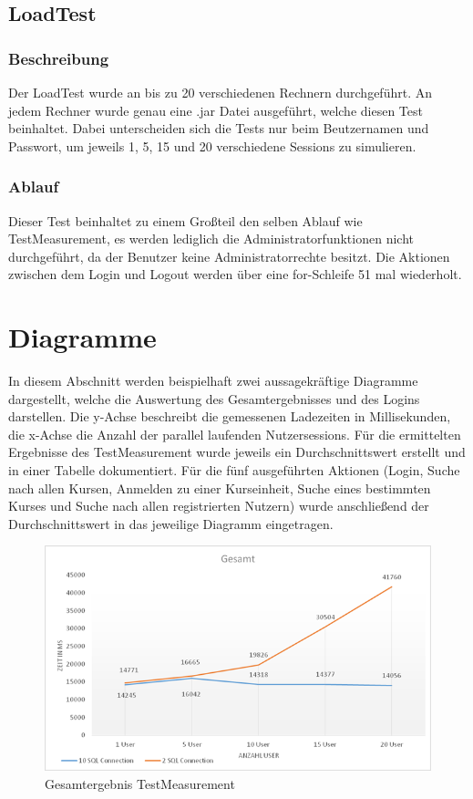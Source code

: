 \subsection{LoadTest}

\subsubsection{Beschreibung}

Der LoadTest wurde an bis zu 20 verschiedenen Rechnern durchgeführt. An jedem Rechner wurde genau eine .jar Datei ausgeführt, welche diesen Test beinhaltet. Dabei unterscheiden sich die Tests nur beim Beutzernamen und Passwort, um jeweils 1, 5, 15 und 20 
verschiedene Sessions zu simulieren.

\subsubsection{Ablauf}

Dieser Test beinhaltet zu einem Großteil den selben Ablauf wie TestMeasurement, es werden lediglich die Administratorfunktionen nicht durchgeführt, da der Benutzer keine Administratorrechte besitzt. Die Aktionen zwischen dem Login und Logout werden über eine for-Schleife 51 mal wiederholt.

\section{Diagramme}

In diesem Abschnitt werden beispielhaft zwei aussagekräftige Diagramme dargestellt, welche die Auswertung des Gesamtergebnisses und des Logins darstellen. Die y-Achse beschreibt die gemessenen Ladezeiten in Millisekunden, die x-Achse die Anzahl der parallel laufenden Nutzersessions.
Für die ermittelten Ergebnisse des TestMeasurement wurde jeweils ein Durchschnittswert erstellt und in einer Tabelle dokumentiert. Für die fünf ausgeführten Aktionen (Login, Suche nach allen Kursen, Anmelden zu einer Kurseinheit, Suche eines bestimmten Kurses und Suche nach allen registrierten Nutzern) wurde anschließend der Durchschnittswert in das jeweilige Diagramm eingetragen.

\begin{figure}[h]
\centering
\includegraphics[width=0.7\linewidth]{img/gesamt}
\caption{Gesamtergebnis TestMeasurement}
\label{fig:TestMeasurement}
\end{figure}

